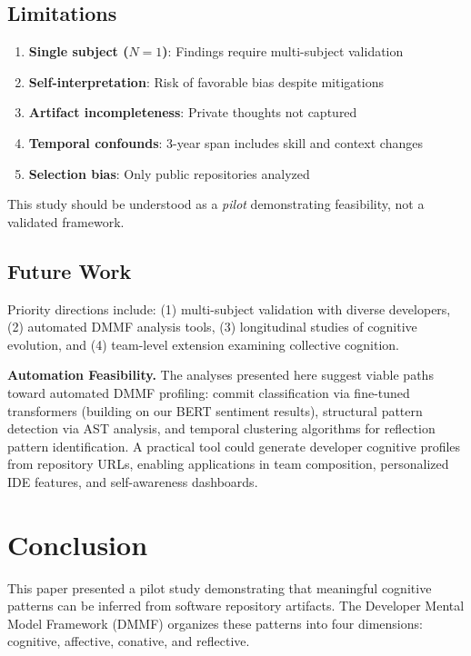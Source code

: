 \documentclass{ntlabs-preprint}
\begin{document}
\subsection{Limitations}

\begin{enumerate}
    \item \textbf{Single subject ($N{=}1$)}: Findings require multi-subject validation
    \item \textbf{Self-interpretation}: Risk of favorable bias despite mitigations
    \item \textbf{Artifact incompleteness}: Private thoughts not captured
    \item \textbf{Temporal confounds}: 3-year span includes skill and context changes
    \item \textbf{Selection bias}: Only public repositories analyzed
\end{enumerate}

This study should be understood as a \textit{pilot} demonstrating feasibility, not a validated framework.

\subsection{Future Work}

Priority directions include: (1) multi-subject validation with diverse developers, (2) automated DMMF analysis tools, (3) longitudinal studies of cognitive evolution, and (4) team-level extension examining collective cognition.

\textbf{Automation Feasibility.} The analyses presented here suggest viable paths toward automated DMMF profiling: commit classification via fine-tuned transformers (building on our BERT sentiment results), structural pattern detection via AST analysis, and temporal clustering algorithms for reflection pattern identification. A practical tool could generate developer cognitive profiles from repository URLs, enabling applications in team composition, personalized IDE features, and self-awareness dashboards.

\section{Conclusion}

This paper presented a pilot study demonstrating that meaningful cognitive patterns can be inferred from software repository artifacts. The Developer Mental Model Framework (DMMF) organizes these patterns into four dimensions: cognitive, affective, conative, and reflective.
\end{document}
